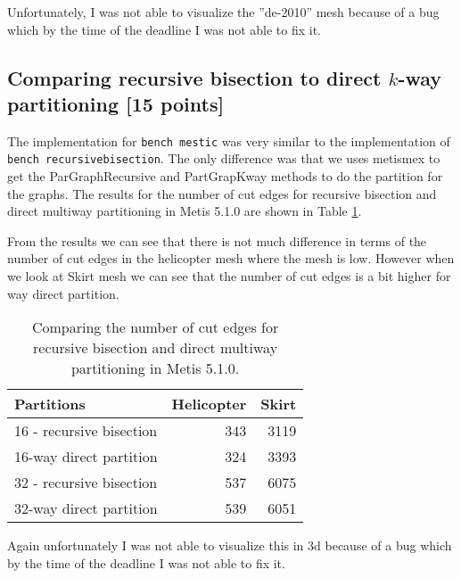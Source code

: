 \documentclass[unicode,11pt,a4paper,oneside,numbers=endperiod,openany]{scrartcl}
\begin{document}
Unfortunately, I was not able to visualize the ”de-2010” mesh because of a bug which by the time of the deadline I was not able to fix it.

\subsection{Comparing recursive bisection to direct $k$-way partitioning [15 points]}

The implementation for \texttt{bench mestic} was very similar to the implementation of \texttt{bench recursivebisection}. The only difference was that we uses metismex to get the ParGraphRecursive and PartGrapKway methods to do the partition for the graphs. The results for the number of cut edges for recursive bisection and direct multiway partitioning in Metis 5.1.0 are shown in Table \ref{table:Compare_Metis}.

From the results we can see that there is not much difference in terms of the number of cut edges in the helicopter mesh where the mesh is low. However when we look at Skirt mesh we can see that the number of cut edges is a bit higher for way direct partition. 
\begin{table}[h]
    \caption{Comparing the number of cut edges for recursive bisection and direct multiway partitioning in Metis 5.1.0.}
    \centering
    \begin{tabular}{l|r|r} \hline\hline
        Partitions               & Helicopter & Skirt \\ \hline
        16 - recursive bisection & 343        & 3119  \\
        16-way direct partition  & 324        & 3393  \\
        32 - recursive bisection & 537        & 6075  \\
        32-way direct partition  & 539        & 6051  \\  \hline \hline
    \end{tabular}
    \label{table:Compare_Metis}
\end{table}

Again unfortunately I was not able to visualize this in 3d because of a bug which by the time of the deadline I was not able to fix it.
\end{document}
